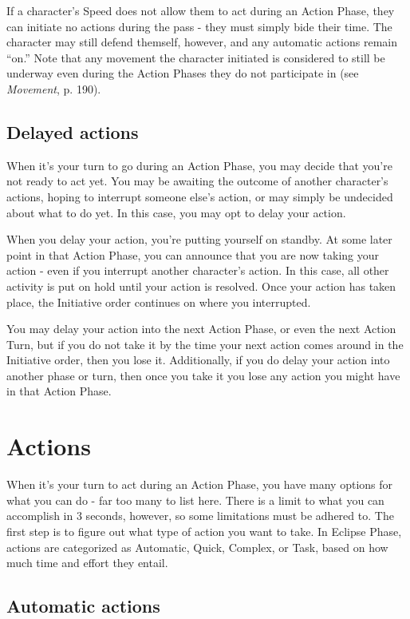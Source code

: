 If a character’s Speed does not allow them to act during an Action Phase, they can initiate no actions during the pass - they must simply bide their time. The character may still defend themself, however, and any automatic actions remain ``on.'' Note that any movement the character initiated is considered to still be underway even during the Action Phases they do not participate in (see \emph{Movement}, p. 190).


\subsection{Delayed actions}
\label{sec:delayed-actions}

When it’s your turn to go during an Action Phase, you may decide that you’re not ready to act yet. You may be awaiting the outcome of another character’s actions, hoping to interrupt someone else’s action, or may simply be undecided about what to do yet. In this case, you may opt to delay your action.

When you delay your action, you’re putting yourself on standby. At some later point in that Action Phase, you can announce that you are now taking your action - even if you interrupt another character’s action. In this case, all other activity is put on hold until your action is resolved. Once your action has taken place, the Initiative order continues on where you interrupted.

You may delay your action into the next Action Phase, or even the next Action Turn, but if you do not take it by the time your next action comes around in the Initiative order, then you lose it. Additionally, if you do delay your action into another phase or turn, then once you take it you lose any action you might have in that Action Phase.


\section{Actions}
\label{sec:actions}

When it’s your turn to act during an Action Phase, you have many options for what you can do - far too many to list here. There is a limit to what you can accomplish in 3 seconds, however, so some limitations must be adhered to. The first step is to figure out what type of action you want to take. In Eclipse Phase, actions are categorized as Automatic, Quick, Complex, or Task, based on how much time and effort they entail.


\subsection{Automatic actions}
\label{sec:combat-automatic-actions}


